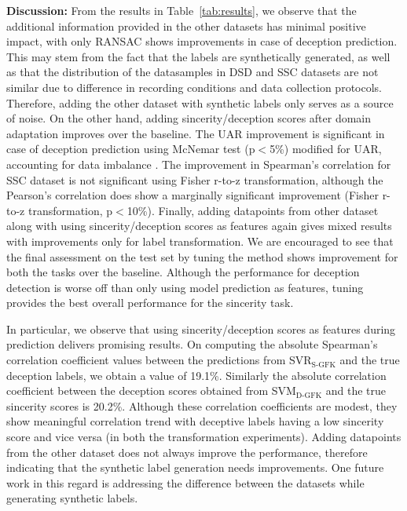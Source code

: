 \documentclass{article}
\begin{document}
\begin{spacing}{0.89}
{\bf Discussion:}
From the results in Table~\ref{tab:results}, we observe that the additional information provided in the other datasets has minimal positive impact, with only RANSAC shows improvements in case of deception prediction.
This may stem from the fact that the labels are synthetically generated, as well as that the distribution of the datasamples in DSD and SSC datasets are not similar due to difference in recording conditions and data collection protocols. 
Therefore, adding the other dataset with synthetic labels only serves as a source of noise.
On the other hand, adding sincerity/deception scores after domain adaptation improves over the baseline. 
The UAR improvement is significant in case of deception prediction using McNemar test (p$<$5\%) modified for UAR, accounting for data imbalance \cite{bone2015applying}.
The improvement in Spearman's correlation for SSC dataset is not significant using Fisher r-to-z transformation, although the Pearson's correlation does show a marginally significant improvement (Fisher r-to-z transformation, p$<$10\%). 
Finally, adding datapoints from other dataset along with using sincerity/deception scores as features again gives mixed results with improvements only for label transformation. 
We are encouraged to see that the final assessment on the test set by tuning the method shows improvement for both the tasks over the baseline.
Although the performance for deception detection is worse off than only using model prediction as features, tuning provides the best overall performance for the sincerity task. 

In particular, we observe that using sincerity/deception scores as features during prediction delivers promising results.
On computing the absolute Spearman's correlation coefficient values between the predictions from SVR$_\text{S-GFK}$ and the true deception labels, we obtain a value of 19.1\%.
Similarly the absolute correlation coefficient between the deception scores obtained from SVM$_\text{D-GFK}$ and the true sincerity scores is 20.2\%.
Although these correlation coefficients are modest, they show meaningful correlation trend with deceptive labels having a low sincerity score and vice versa (in both the transformation experiments).  
Adding datapoints from the other dataset does not always improve the performance, therefore indicating that the synthetic label generation needs improvements. 
One future work in this regard is addressing the difference between the datasets while generating synthetic labels. 


\end{spacing}
\end{document}
